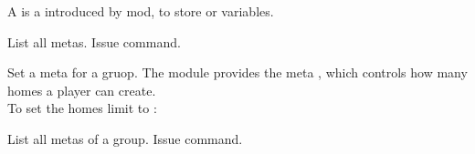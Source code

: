 \label{ch:meta}
A  is a  introduced by  mod, to store  or  variables.

\begin{tips}{List all metas.}
    Issue  command.
\end{tips}

\begin{example}{Set a meta for a gruop.}
    The  module provides the meta , which controls how many homes a player can create. \\
    To set the homes limit to : 
\end{example}

\begin{example}{List all metas of a group.}
    Issue  command.
\end{example}
